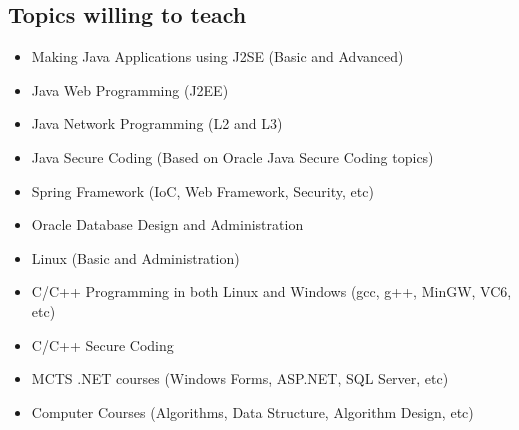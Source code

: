 \documentclass[12pt,a4paper]{article}
\begin{document}
\clearpage

\begin{mdframed}[leftmargin=10pt,rightmargin=10pt]
\section{Topics willing to teach}
	\begin{itemize}
		\item Making Java Applications using J2SE (Basic and Advanced)
		\item Java Web Programming (J2EE)
		\item Java Network Programming (L2 and L3)
		\item Java Secure Coding (Based on Oracle Java Secure Coding topics)
		\item Spring Framework (IoC, Web Framework, Security, etc)
		\item Oracle Database Design and Administration
		\item Linux (Basic and Administration)
		\item C/C++ Programming in both Linux and Windows (gcc, g++, MinGW, VC6, etc)
		\item C/C++ Secure Coding
		\item MCTS .NET courses (Windows Forms, ASP.NET, SQL Server, etc)
		\item Computer Courses (Algorithms, Data Structure, Algorithm Design, etc)
	\end{itemize}
	
\end{mdframed}
\end{document}
